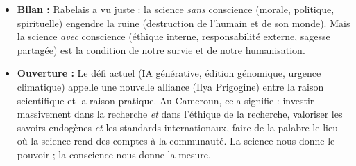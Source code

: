 \documentclass[11pt]{article}
\newcommand{\cle}[1]{{\popxbold\color{popdark}#1}}
\newcounter{popsec}
\newcounter{popsub}
\newcommand{\courssub}[1]{%
  \stepcounter{popsub}%
  \par\vspace{9pt}\noindent{\popxbold\fontsize{11.5}{13}\selectfont\color{popink}{\color{poporange}\thepopsec.\thepopsub}\hspace{6pt}#1}\par\nopagebreak\vspace{4pt}
}
\begin{document}
\begin{corrige}
\courssub{Conclusion}
\begin{itemize}
\item \textbf{Bilan :} Rabelais a vu juste : la science \emph{sans} conscience (morale, politique, spirituelle) engendre la ruine (destruction de l'humain et de son monde). Mais la science \emph{avec} conscience (éthique interne, responsabilité externe, sagesse partagée) est la condition de notre \cle{survie} et de notre \cle{humanisation}.
\item \textbf{Ouverture :} Le défi actuel (IA générative, édition génomique, urgence climatique) appelle une \cle{nouvelle alliance} (Ilya Prigogine) entre la raison scientifique et la raison pratique. Au Cameroun, cela signifie : investir massivement dans la recherche \emph{et} dans l'éthique de la recherche, valoriser les savoirs endogènes \emph{et} les standards internationaux, faire de la \cle{palabre} le lieu où la science rend des comptes à la communauté. \guillemotleft La science nous donne le pouvoir ; la conscience nous donne la mesure. \guillemotright
\end{itemize}
\end{corrige}
\end{document}
